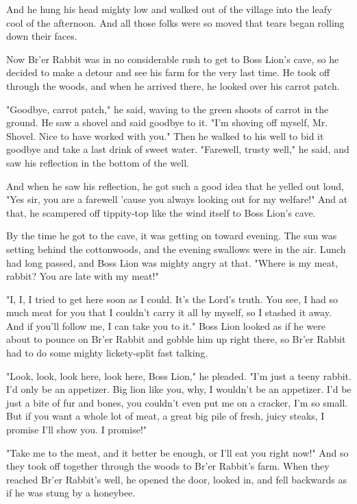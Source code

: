 And he hung his head mighty low and walked out of the village into the leafy cool of the afternoon. And all those folks were so moved that tears began rolling down their faces.

Now Br'er Rabbit was in no considerable rush to get to Boss Lion's cave, so he decided to make a detour and see his farm for the very last time. He took off through the woods, and when he arrived there, he looked over his carrot patch.

"Goodbye, carrot patch," he said, waving to the green shoots of carrot in the ground. He saw a shovel and said goodbye to it. "I'm shoving off myself, Mr. Shovel. Nice to have worked with you." Then he walked to his well to bid it goodbye and take a last drink of sweet water. "Farewell, trusty well," he said, and saw his reflection in the bottom of the well.

And when he saw his reflection, he got such a good idea that he yelled out loud, "Yes sir, you are a farewell 'cause you always looking out for my welfare!" And at that, he scampered off tippity-top like the wind itself to Boss Lion's cave.

By the time he got to the cave, it was getting on toward evening. The sun was setting behind the cottonwoods, and the evening swallows were in the air. Lunch had long passed, and Boss Lion was mighty angry at that. "Where is my meat, rabbit? You are late with my meat!"

"I, I, I tried to get here soon as I could. It's the Lord's truth. You see, I had so much meat for you that I couldn't carry it all by myself, so I stashed it away. And if you'll follow me, I can take you to it." Boss Lion looked as if he were about to pounce on Br'er Rabbit and gobble him up right there, so Br'er Rabbit had to do some mighty lickety-split fast talking.

"Look, look, look here, look here, Boss Lion," he pleaded. "I'm just a teeny rabbit. I'd only be an appetizer. Big lion like you, why, I wouldn't be an appetizer. I'd be just a bite of fur and bones, you couldn't even put me on a cracker, I'm so small. But if you want a whole lot of meat, a great big pile of fresh, juicy steaks, I promise I'll show you. I promise!"

"Take me to the meat, and it better be enough, or I'll eat you right now!" And so they took off together through the woods to Br'er Rabbit's farm. When they reached Br'er Rabbit's well, he opened the door, looked in, and fell backwards as if he was stung by a honeybee.

